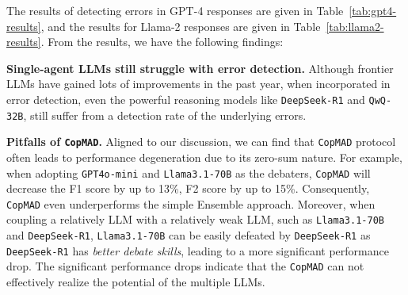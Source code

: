 \documentclass{article} %
\newcommand{\copmad}[0]{\texttt{CopMAD}\xspace}
\newcommand{\mad}[0]{\texttt{MAD}\xspace}
\begin{document}
The results of detecting errors in GPT-4 responses are given in Table~\ref{tab:gpt4-results}, and the results for Llama-2 responses are given in Table~\ref{tab:llama2-results}. From the results, we have the following findings:

\textbf{Single-agent LLMs still struggle with error detection.} Although frontier LLMs have gained lots of improvements in the past year, when incorporated in error detection, even the powerful reasoning models like \texttt{DeepSeek-R1} and \texttt{QwQ-32B}, still suffer from a detection rate of the underlying errors. 

\textbf{Pitfalls of \copmad.} Aligned to our discussion, we can find that \copmad protocol often leads to performance degeneration due to its zero-sum nature. For example, when adopting \texttt{GPT4o-mini} and \texttt{Llama3.1-70B} as the debaters, \copmad will decrease the F1 score by up to 13\%, F2 score by up to 15\%. 
Consequently, \copmad even underperforms the simple Ensemble approach.
Moreover, when coupling a relatively LLM with a relatively weak LLM, such as \texttt{Llama3.1-70B} and \texttt{DeepSeek-R1}, \texttt{Llama3.1-70B} can be easily defeated by \texttt{DeepSeek-R1} as \texttt{DeepSeek-R1} has \textit{better debate skills}, leading to a more significant performance drop.
The significant performance drops indicate that the \copmad can not effectively realize the potential of the multiple LLMs.
\end{document}
